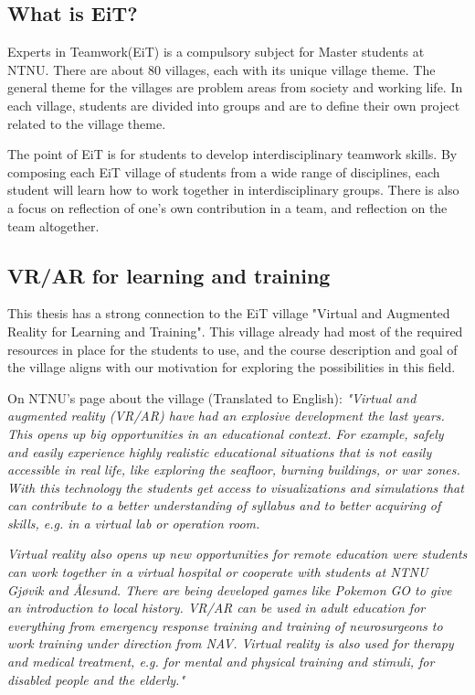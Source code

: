         \subsection{What is EiT?}
        Experts in Teamwork(EiT) is a compulsory subject for Master students at NTNU. There are about 80 villages, each with its unique village theme. The general theme for the villages are problem areas from society and working life. In each village, students are divided into groups and are to define their own project related to the village theme.\cite{EiTAbout}
        
        The point of EiT is for students to develop interdisciplinary teamwork skills. By composing each EiT village of students from a wide range of disciplines, each student will learn how to work together in interdisciplinary groups. There is also a focus on reflection of one's own contribution in a team, and reflection on the team altogether.\cite{EiTAbout}
    
        \subsection{VR/AR for learning and training}
        This thesis has a strong connection to the EiT village "Virtual and Augmented Reality for Learning and Training". This village already had most of the required resources in place for the students to use, and the course description and goal of the village aligns with our motivation for exploring the possibilities in this field.
        
        On NTNU's page about the village (Translated to English):
        \emph{"Virtual and augmented reality (VR/AR) have had an explosive development the last years. This opens up big opportunities in an educational context. For example, safely and easily experience highly realistic educational situations that is not easily accessible in real life, like exploring the seafloor, burning buildings, or war zones. With this technology the students get access to visualizations and simulations that can contribute to a better understanding of syllabus and to better acquiring of skills, e.g. in a virtual lab or operation room.}
        
        \emph{Virtual reality also opens up new opportunities for remote education were students can work together in a virtual hospital or cooperate with students at NTNU Gjøvik and Ålesund. There are being developed games like Pokemon GO to give an introduction to local history. VR/AR can be used in adult education for everything from emergency response training and training of neurosurgeons to work training under direction from NAV. Virtual reality is also used for therapy and medical treatment, e.g. for mental and physical training and stimuli, for disabled people and the elderly."} \cite{EiTVRLandsby}
    
